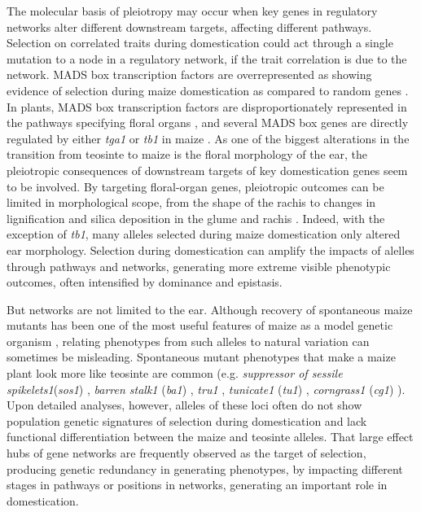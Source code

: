 \documentclass[9pt,twocolumn,twoside]{rilabRxiv}
\begin{document}
The molecular basis of pleiotropy may occur when key genes in regulatory networks alter different downstream targets, affecting different pathways.
Selection on correlated traits during domestication could act through a single mutation to a node in a regulatory network, if the trait correlation is due to the network.
 MADS box transcription factors are overrepresented as showing evidence of selection during maize domestication as compared to random genes \citep{zhao2011}.
In plants, MADS box transcription factors are disproportionately represented in the pathways specifying floral organs \citep{theissen2001}, and several MADS box genes are directly regulated by either \textit{tga1} or \textit{tb1} in maize \citep{wang2015, studer2017}.
As one of the biggest alterations in the transition from teosinte to maize is the floral morphology of the ear, the pleiotropic consequences of downstream targets of key domestication genes seem to be involved.
By targeting floral-organ genes, pleiotropic outcomes can be limited in morphological scope, from the shape of the rachis to changes in lignification and silica deposition in the glume and rachis \citep{doebley1996, dorweiler1997}.
Indeed, with the exception of \textit{tb1}, many alleles selected during maize domestication only altered ear morphology.
Selection during domestication can amplify the impacts of alelles through pathways and networks, generating more extreme visible phenotypic outcomes, often intensified by dominance and epistasis.

But networks are not limited to the ear.
Although recovery of spontaneous maize mutants has been one of the most useful features of maize as a model genetic organism \citep{strable2009, nannas2015}, relating phenotypes from such alleles to natural variation can sometimes be misleading.
Spontaneous mutant phenotypes that make a maize plant look more like teosinte are common (e.g. \textit{suppressor of sessile spikelets1}(\textit{sos1}) \citep{doebley1995sos1}, \textit{barren stalk1} (\textit{ba1}) \citep{gallavotti2004}, \textit{tru1} \citep{dong2017}, \textit{tunicate1} (\textit{tu1}) \citep{wingen2012}, \textit{corngrass1} (\textit{cg1}) \citep{chuck2007}).
Upon detailed analyses, however, alleles of these loci often do not show population genetic signatures of selection during domestication and lack functional differentiation between the maize and teosinte alleles.
That large effect hubs of gene networks are frequently observed as the target of selection, producing genetic redundancy in generating phenotypes,  by impacting different stages in pathways or positions in networks, generating an important role in domestication.
\end{document}
